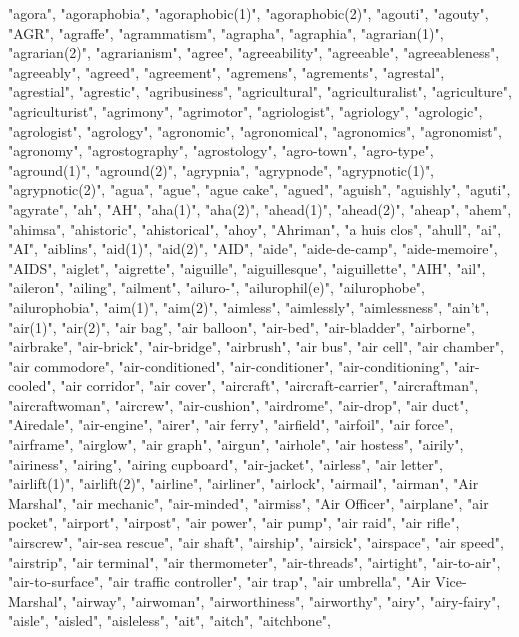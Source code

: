 "agora",
"agoraphobia",
"agoraphobic(1)",
"agoraphobic(2)",
"agouti",
"agouty",
"AGR",
"agraffe",
"agrammatism",
"agrapha",
"agraphia",
"agrarian(1)",
"agrarian(2)",
"agrarianism",
"agree",
"agreeability",
"agreeable",
"agreeableness",
"agreeably",
"agreed",
"agreement",
"agremens",
"agrements",
"agrestal",
"agrestial",
"agrestic",
"agribusiness",
"agricultural",
"agriculturalist",
"agriculture",
"agriculturist",
"agrimony",
"agrimotor",
"agriologist",
"agriology",
"agrologic",
"agrologist",
"agrology",
"agronomic",
"agronomical",
"agronomics",
"agronomist",
"agronomy",
"agrostography",
"agrostology",
"agro-town",
"agro-type",
"aground(1)",
"aground(2)",
"agrypnia",
"agrypnode",
"agrypnotic(1)",
"agrypnotic(2)",
"agua",
"ague",
"ague cake",
"agued",
"aguish",
"aguishly",
"aguti",
"agyrate",
"ah",
"AH",
"aha(1)",
"aha(2)",
"ahead(1)",
"ahead(2)",
"aheap",
"ahem",
"ahimsa",
"ahistoric",
"ahistorical",
"ahoy",
"Ahriman",
"a huis clos",
"ahull",
"ai",
"AI",
"aiblins",
"aid(1)",
"aid(2)",
"AID",
"aide",
"aide-de-camp",
"aide-memoire",
"AIDS",
"aiglet",
"aigrette",
"aiguille",
"aiguillesque",
"aiguillette",
"AIH",
"ail",
"aileron",
"ailing",
"ailment",
"ailuro-",
"ailurophil(e)",
"ailurophobe",
"ailurophobia",
"aim(1)",
"aim(2)",
"aimless",
"aimlessly",
"aimlessness",
"ain't",
"air(1)",
"air(2)",
"air bag",
"air balloon",
"air-bed",
"air-bladder",
"airborne",
"airbrake",
"air-brick",
"air-bridge",
"airbrush",
"air bus",
"air cell",
"air chamber",
"air commodore",
"air-conditioned",
"air-conditioner",
"air-conditioning",
"air-cooled",
"air corridor",
"air cover",
"aircraft",
"aircraft-carrier",
"aircraftman",
"aircraftwoman",
"aircrew",
"air-cushion",
"airdrome",
"air-drop",
"air duct",
"Airedale",
"air-engine",
"airer",
"air ferry",
"airfield",
"airfoil",
"air force",
"airframe",
"airglow",
"air graph",
"airgun",
"airhole",
"air hostess",
"airily",
"airiness",
"airing",
"airing cupboard",
"air-jacket",
"airless",
"air letter",
"airlift(1)",
"airlift(2)",
"airline",
"airliner",
"airlock",
"airmail",
"airman",
"Air Marshal",
"air mechanic",
"air-minded",
"airmiss",
"Air Officer",
"airplane",
"air pocket",
"airport",
"airpost",
"air power",
"air pump",
"air raid",
"air rifle",
"airscrew",
"air-sea rescue",
"air shaft",
"airship",
"airsick",
"airspace",
"air speed",
"airstrip",
"air terminal",
"air thermometer",
"air-threads",
"airtight",
"air-to-air",
"air-to-surface",
"air traffic controller",
"air trap",
"air umbrella",
"Air Vice-Marshal",
"airway",
"airwoman",
"airworthiness",
"airworthy",
"airy",
"airy-fairy",
"aisle",
"aisled",
"aisleless",
"ait",
"aitch",
"aitchbone",
